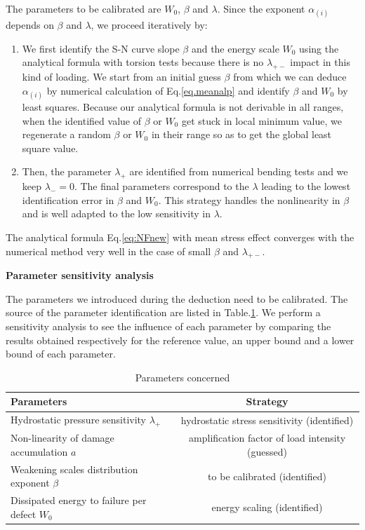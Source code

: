 \documentclass[3p,times,procedia,number]{elsarticle}
\begin{document}
The parameters to be calibrated are $W_0$, $\beta$ and $\lambda$. Since the exponent $\alpha_{(i)}$ depends on $\beta$ and $\lambda$, we proceed iteratively by:

\begin{enumerate}
	\item We first identify the S-N curve slope $\beta$ and the energy scale $W_0$ using the analytical formula with torsion tests because there is no $\lambda_{+-}$ impact in this kind of loading. We start from an initial guess $\beta$ from which we can deduce $\alpha_{(i)}$ by  numerical calculation of Eq.\ref{eq.meanalp} and identify $\beta$ and $W_0$ by least squares. Because our analytical formula is not derivable in all ranges, when the identified value of $\beta$ or $W_0$ get stuck in local minimum value, we regenerate a random $\beta$ or $W_0$ in their range so as to get the global least square value.
	\item Then, the parameter $\lambda_{+}$ are identified from numerical bending tests and we keep $\lambda_-=0$. The final parameters correspond to the $\lambda$ leading to the lowest identification error in $\beta$ and $W_0$. This strategy handles the nonlinearity in $\beta$ and is well adapted to the low sensitivity in $\lambda$.
\end{enumerate}



The analytical formula Eq.\eqref{eq:NFnew} with mean stress effect converges with the numerical method very well in the case of small $\beta$ and $\lambda_{+-}$. 


\textbf{Parameter sensitivity analysis}

The parameters we introduced during the deduction need to be calibrated. The source of the parameter identification are listed in Table.\ref{paras}.
We perform a sensitivity analysis to see the influence of each parameter by comparing the results obtained respectively for the reference value, an upper bound and a lower bound of each parameter.

\begin{table}[!h]
	\centering
	\begin{tabular}{l|c}
		\hline
		\textbf{Parameters}                                  & \multicolumn{1}{c}{\textbf{Strategy}} \\ \hline
		Hydrostatic pressure sensitivity $\lambda_+$           & hydrostatic stress sensitivity (identified)         \\
		Non-linearity of damage accumulation  $a$        & amplification factor of load intensity (guessed)     \\
		Weakening scales distribution exponent  $\beta$      & to be calibrated (identified)                   \\
		Dissipated energy to failure per defect  $W_0$ & energy scaling (identified)              \\ \hline
	\end{tabular}
	\caption{Parameters concerned}
	\label{paras}
\end{table}
\end{document}
